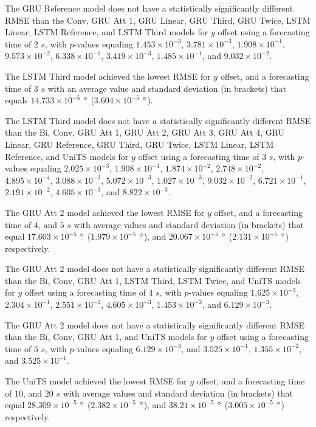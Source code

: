 \documentclass[preprint,12pt]{elsarticle}
\begin{document}
The GRU Reference model does not have a statistically significantly different RMSE than the Conv, GRU Att 1, GRU Linear, GRU Third, GRU Twice, LSTM Linear, LSTM Reference, and LSTM Third models for $y$ offset using a forecasting time of $2$ $s$, with $p$-values equaling $1.453 \times 10^{-3}$, $3.781 \times 10^{-3}$, $1.908 \times 10^{-1}$, $9.573 \times 10^{-2}$, $6.338 \times 10^{-1}$, $3.419 \times 10^{-3}$, $1.485 \times 10^{-1}$, and $9.032 \times 10^{-2}$.

The LSTM Third model achieved the lowest RMSE for $y$ offset, and a forecasting time of $3$ $s$ with an average value and standard deviation (in brackets) that equals $14.733 \times 10^{-5}$ $\degree$ ($3.604 \times 10^{-5}$ $\degree$).

The LSTM Third model does not have a statistically significantly different RMSE than the Bi, Conv, GRU Att 1, GRU Att 2, GRU Att 3, GRU Att 4, GRU Linear, GRU Reference, GRU Third, GRU Twice, LSTM Linear, LSTM Reference, and UniTS models for $y$ offset using a forecasting time of $3$ $s$, with $p$-values equaling $2.025 \times 10^{-3}$, $1.908 \times 10^{-1}$, $1.874 \times 10^{-2}$, $2.748 \times 10^{-2}$, $4.895 \times 10^{-4}$, $3.088 \times 10^{-3}$, $5.072 \times 10^{-3}$, $1.027 \times 10^{-3}$, $9.032 \times 10^{-2}$, $6.721 \times 10^{-1}$, $2.191 \times 10^{-2}$, $4.605 \times 10^{-3}$, and $8.822 \times 10^{-3}$.

The GRU Att 2 model achieved the lowest RMSE for $y$ offset, and a forecasting time of $4$, and $5$ $s$ with average values and standard deviation (in brackets) that equal $17.603 \times 10^{-5}$ $\degree$ ($1.979 \times 10^{-5}$ $\degree$), and $20.067 \times 10^{-5}$ $\degree$ ($2.131 \times 10^{-5}$ $\degree$) respectively.

The GRU Att 2 model does not have a statistically significantly different RMSE than the Bi, Conv, GRU Att 1, LSTM Third, LSTM Twice, and UniTS models for $y$ offset using a forecasting time of $4$ $s$, with $p$-values equaling $1.625 \times 10^{-3}$, $2.304 \times 10^{-1}$, $2.551 \times 10^{-2}$, $4.605 \times 10^{-3}$, $1.453 \times 10^{-3}$, and $6.129 \times 10^{-3}$.

The GRU Att 2 model does not have a statistically significantly different RMSE than the Bi, Conv, GRU Att 1, and UniTS models for $y$ offset using a forecasting time of $5$ $s$, with $p$-values equaling $6.129 \times 10^{-3}$, and $3.525 \times 10^{-1}$, $1.355 \times 10^{-2}$, and $3.525 \times 10^{-1}$.

The UniTS model achieved the lowest RMSE for $y$ offset, and a forecasting time of $10$, and $20$ $s$ with average values and standard deviation (in brackets) that equal $28.309 \times 10^{-5}$ $\degree$ ($2.382 \times 10^{-5}$ $\degree$), and $38.21 \times 10^{-5}$ $\degree$ ($3.005 \times 10^{-5}$ $\degree$) respectively.
\end{document}
